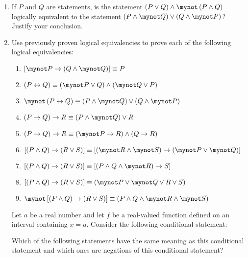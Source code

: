 \begin{enumerate}
\item If $P$ and $Q$ are statements, is the statement 
$\left( P \vee Q \right) \wedge \mynot \left( P \wedge Q \right)$ logically equivalent to the statement $\left( P \wedge \mynot Q \right) \vee \left( Q \wedge \mynot P \right)$?  Justify your conclusion. \label{exer:sec23-9}


\item Use previously proven logical equivalencies to prove each of the following logical equivalencies:  \label{exer:sec23-8}
\begin{enumerate}
\item $\left[ {\mynot  P \to \left( {Q \wedge \mynot  Q} \right)} \right] \equiv P$
\item $\left( P \leftrightarrow Q \right) \equiv \left( \mynot P \vee Q \right) \wedge 
\left( \mynot Q \vee P \right)$
\item $\mynot \left( P \leftrightarrow Q \right) \equiv \left( P \wedge \mynot Q \right) \vee 
\left( Q \wedge \mynot P \right) $ 
\item $\left( P \to Q \right) \to R \equiv \left( P \wedge \mynot Q \right) \vee R$
\item $\left( P \to Q \right) \to R \equiv \left( \mynot P \to R \right) \wedge 
\left( Q \to R \right)$
\item $\left[ \left( P \wedge Q \right) \to \left( R \vee S \right) \right] \equiv 
\left[ \left( \mynot R \wedge \mynot S \right) \to \left( \mynot P \vee \mynot Q \right) \right]$
\item $\left[ \left( P \wedge Q \right) \to \left( R \vee S \right) \right] \equiv 
\left[ \left( P \wedge Q \wedge \mynot R \right) \to S \right]$
\item $\left[ \left( P \wedge Q \right) \to \left( R \vee S \right) \right] \equiv 
\left( \mynot P \vee \mynot Q \vee R \vee S \right)$
\item $\mynot \left[ \left( P \wedge Q \right) \to \left( R \vee S \right) \right] \equiv 
\left( P \wedge Q \wedge \mynot R \wedge  \mynot S \right)$
\end{enumerate} 





\xitem Let $a$ be a real number and let  $f$  be a real-valued function defined on an interval containing $x = a$.  Consider the following conditional statement: 
\label{exer:diffimpliescont}
Which of the following statements have the same meaning as this conditional statement and which ones are negations of this conditional statement?  


\end{enumerate}
